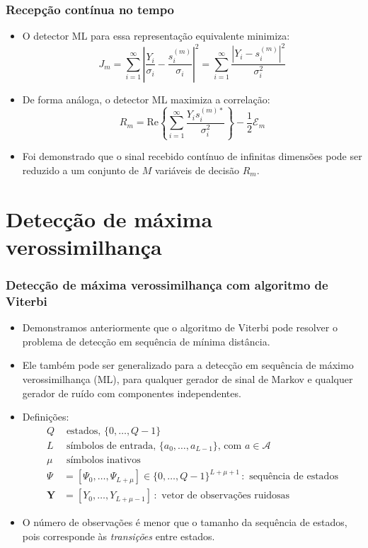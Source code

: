 \begin{frame}
	\frametitle{Recepção contínua no tempo}

	\begin{itemize}
	    \item O detector ML para essa representação equivalente minimiza:
	    \begin{equation*}
		J_m = \sum_{i=1}^{\infty} \left|\frac{Y_i}{\sigma_i} - \frac{s_i^{(m)}}{\sigma_i}  \right|^2 = \sum_{i=1}^{\infty} \frac{\left|Y_i - s_i^{(m)}\right|^2}{\sigma_i^2}
	    \end{equation*}
	    \item De forma análoga, o detector ML maximiza a correlação:
	    \begin{equation*}
		R_m = \mathrm{Re}\left\{\sum_{i=1}^{\infty} \frac{Y_is_i^{(m)*}}{\sigma_i^2} \right\} - \frac{1}{2}\mathcal{E}_m
	    \end{equation*}
	    \item Foi demonstrado que o sinal recebido contínuo de infinitas dimensões pode ser reduzido a um conjunto de $M$ variáveis de decisão $R_m$.
	\end{itemize}			
\end{frame}

\section{Detecção de máxima verossimilhança}

\begin{frame}
	\frametitle{Detecção de máxima verossimilhança com algoritmo de Viterbi}

	\begin{itemize}
	    \item Demonstramos anteriormente que o algoritmo de Viterbi pode resolver o problema de detecção em sequência de mínima distância.
	    \item Ele também pode ser generalizado para a detecção em sequência de máximo verossimilhança (ML), para qualquer gerador de sinal de Markov e qualquer gerador de ruído com componentes independentes.
	    \item Definições:\vspace{-0.2cm}
	    \begin{align*}
		    Q &\text{ estados, } \{0,\ldots,Q-1 \} \\
		    L &\text { símbolos de entrada, } \{a_0,\ldots, a_{L-1} \} \text{, com } a\in \mathcal{A} \\
		    \mu &\text{ símbolos inativos} \\
		    \Psi &= [ \Psi_0, \ldots, \Psi_{L+\mu} ] \in \{0,\ldots,Q-1 \}^{L+\mu+1} \, : \text{ sequência de estados} \\
		    \mathbf{Y} &= [Y_0, \ldots, Y_{L+\mu-1}] \, : \text{ vetor de observações ruidosas}
	    \end{align*}
	    \item O número de observações é menor que o tamanho da sequência de estados, pois corresponde às \textit{transições} entre estados.
	\end{itemize}			
\end{frame}


